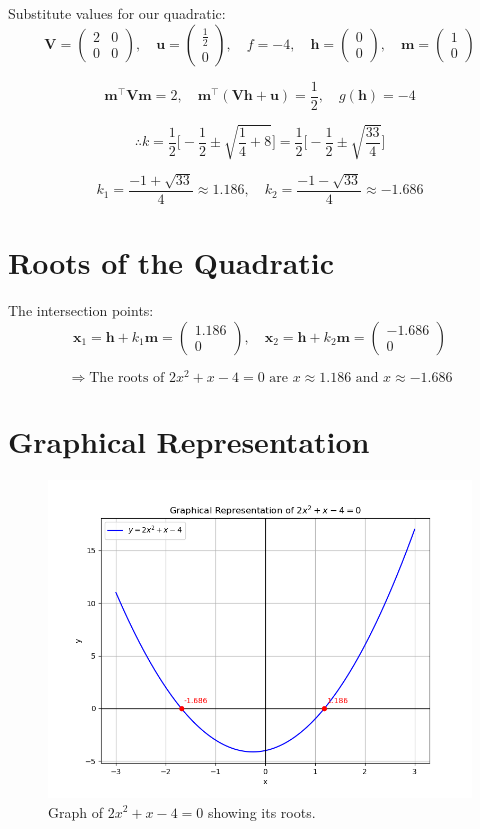\documentclass[12pt]{article}
\newcommand{\myvec}[1]{\begin{pmatrix}#1\end{pmatrix}}
\let\vec\mathbf
\begin{document}
Substitute values for our quadratic:
\[
\vec{V} = \myvec{2 & 0 \\ 0 & 0}, \quad
\vec{u} = \myvec{\frac{1}{2} \\ 0}, \quad
f = -4, \quad
\vec{h} = \myvec{0 \\ 0}, \quad
\vec{m} = \myvec{1 \\ 0}
\]

\[
\vec{m}^{\top} \vec{V} \vec{m} = 2, \quad
\vec{m}^{\top}(\vec{V}\vec{h} + \vec{u}) = \frac{1}{2}, \quad
g(\vec{h}) = -4
\]

\[
\therefore k = \frac{1}{2} \Big[-\frac{1}{2} \pm \sqrt{\frac{1}{4}+8} \Big] = \frac{1}{2} \Big[-\frac{1}{2} \pm \sqrt{\frac{33}{4}} \Big]
\]

\[
k_1 = \frac{-1 + \sqrt{33}}{4} \approx 1.186, \quad
k_2 = \frac{-1 - \sqrt{33}}{4} \approx -1.686
\]

\section*{Roots of the Quadratic}
The intersection points:
\[
\vec{x}_1 = \vec{h} + k_1 \vec{m} = \myvec{1.186 \\ 0}, \quad
\vec{x}_2 = \vec{h} + k_2 \vec{m} = \myvec{-1.686 \\ 0}
\]

\[
\Rightarrow \text{The roots of } 2x^2 + x - 4 = 0 \text{ are } x \approx 1.186 \text{ and } x \approx -1.686
\]

\section*{Graphical Representation}
\begin{figure}[h!]
    \centering
    \includegraphics[height=0.5\textheight, keepaspectratio]{Figs/Figure_1.png}
    \caption{Graph of $2x^2 + x - 4 = 0$ showing its roots.}
    \label{figure_1}
\end{figure}
\end{document}
